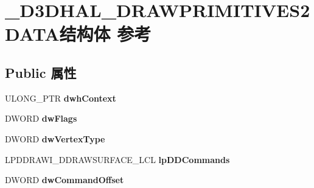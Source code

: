 \hypertarget{struct___d3_d_h_a_l___d_r_a_w_p_r_i_m_i_t_i_v_e_s2_d_a_t_a}{}\section{\+\_\+\+D3\+D\+H\+A\+L\+\_\+\+D\+R\+A\+W\+P\+R\+I\+M\+I\+T\+I\+V\+E\+S2\+D\+A\+T\+A结构体 参考}
\label{struct___d3_d_h_a_l___d_r_a_w_p_r_i_m_i_t_i_v_e_s2_d_a_t_a}
\subsection*{Public 属性}
\begin{DoxyCompactItemize}
\item 
\mbox{\label{struct___d3_d_h_a_l___d_r_a_w_p_r_i_m_i_t_i_v_e_s2_d_a_t_a_ac81880462ccdf0c079ca74a1908905f6}} 
U\+L\+O\+N\+G\+\_\+\+P\+TR {\bfseries dwh\+Context}
\item 
\mbox{\label{struct___d3_d_h_a_l___d_r_a_w_p_r_i_m_i_t_i_v_e_s2_d_a_t_a_a38744975b4b39a3833a9eea746a2e265}} 
D\+W\+O\+RD {\bfseries dw\+Flags}
\item 
\mbox{\label{struct___d3_d_h_a_l___d_r_a_w_p_r_i_m_i_t_i_v_e_s2_d_a_t_a_ab2cc8201125fb58cd45e24038502b814}} 
D\+W\+O\+RD {\bfseries dw\+Vertex\+Type}
\item 
\mbox{\label{struct___d3_d_h_a_l___d_r_a_w_p_r_i_m_i_t_i_v_e_s2_d_a_t_a_a307c3ed3dfce14fda8cc89083e01dc46}} 
L\+P\+D\+D\+R\+A\+W\+I\+\_\+\+D\+D\+R\+A\+W\+S\+U\+R\+F\+A\+C\+E\+\_\+\+L\+CL {\bfseries lp\+D\+D\+Commands}
\item 
\mbox{\label{struct___d3_d_h_a_l___d_r_a_w_p_r_i_m_i_t_i_v_e_s2_d_a_t_a_a2e08e592a5a5d9042e4b7490095ac05c}} 
D\+W\+O\+RD {\bfseries dw\+Command\+Offset}
\item 
\mbox{\label{struct___d3_d_h_a_l___d_r_a_w_p_r_i_m_i_t_i_v_e_s2_d_a_t_a_abd3d2d86155b5e1cefd0cb22c4a77de1}} 

\end{DoxyCompactItemize}
